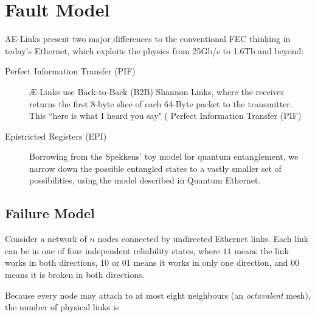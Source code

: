 \documentclass[../../../OAE-SPEC-MAIN.tex]{subfiles}
\begin{document}
\section{Fault Model}


AE-Links present two major differences to the conventional FEC thinking in today's Ethernet, which exploits the physics from 25Gb/s to 1.6Tb and beyond:

\begin{description}
\item [Perfect Information Transfer (PIF)] Æ-Links use Back-to-Back (B2B) Shannon Links, where the receiver returns the first 8-byte slice of each 64-Byte packet to the transmitter. This ``here is what I heard you say" ( Perfect Information Transfer (PIF)\cite{Paper from Garner}

\item [Epistricted Registers (EPI)] Borrowing from the Spekkens' toy model for quantum entanglement, we narrow down the possible entangled states to a vastly smaller set of possibilities, using the model described in Quantum Ethernet\cite{Quantum Ethernet}.
\end{description}



\subsection{Failure Model}

Consider a network of \(n\) nodes connected by undirected Ethernet
links.  Each link can be in one of four independent reliability
states,
\marginnote{
\[
\Sigma=\{00,01,10,11\},
\]}
where \(11\) means the link works in both directions, \(10\) or
\(01\) means it works in only one direction, and \(00\) means it
is broken in both directions.


Because every node may attach to at most eight neighbours (an
\emph{octavalent} mesh), the number of physical links is
\marginnote{
\[
L(n)=\min\!\bigl\{\tbinom{n}{2},\,4n\bigr\}
=
\begin{cases}
\binom{n}{2}, & n\le 9,\\[6pt]
4n,            & n\ge 9.
\end{cases}
\]}
\end{document}
